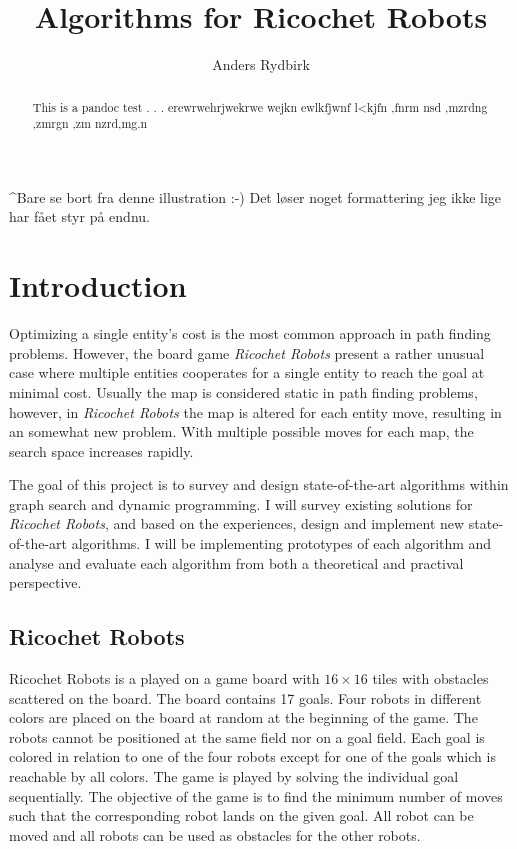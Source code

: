 \documentclass[]{article}
\title{Algorithms for Ricochet Robots}
\author{Anders Rydbirk}
\date{}
\begin{document}
\maketitle
\begin{abstract}
This is a pandoc test . . . erewrwehrjwekrwe wejkn ewlkfjwnf
l\textless{}kjfn ,fnrm nsd ,mzrdng ,zmrgn ,zm nzrd,mg.n \newpage
\end{abstract}

{
\hypersetup{linkcolor=black}
\setcounter{tocdepth}{3}
\tableofcontents
}
\^{}Bare se bort fra denne illustration :-) Det løser noget formattering
jeg ikke lige har fået styr på endnu.

\newpage

\section{Introduction}\label{introduction}

Optimizing a single entity's cost is the most common approach in path
finding problems. However, the board game \emph{Ricochet Robots} present
a rather unusual case where multiple entities cooperates for a single
entity to reach the goal at minimal cost. Usually the map is considered
static in path finding problems, however, in \emph{Ricochet Robots} the
map is altered for each entity move, resulting in an somewhat new
problem. With multiple possible moves for each map, the search space
increases rapidly.

The goal of this project is to survey and design state-of-the-art
algorithms within graph search and dynamic programming. I will survey
existing solutions for \emph{Ricochet Robots}, and based on the
experiences, design and implement new state-of-the-art algorithms. I
will be implementing prototypes of each algorithm and analyse and
evaluate each algorithm from both a theoretical and practival
perspective.

\subsection{Ricochet Robots}\label{ricochet-robots}

Ricochet Robots is a played on a game board with \(16 \times 16\) tiles
with obstacles scattered on the board. The board contains 17 goals. Four
robots in different colors are placed on the board at random at the
beginning of the game. The robots cannot be positioned at the same field
nor on a goal field. Each goal is colored in relation to one of the four
robots except for one of the goals which is reachable by all colors. The
game is played by solving the individual goal sequentially. The
objective of the game is to find the minimum number of moves such that
the corresponding robot lands on the given goal. All robot can be moved
and all robots can be used as obstacles for the other robots.
\end{document}

